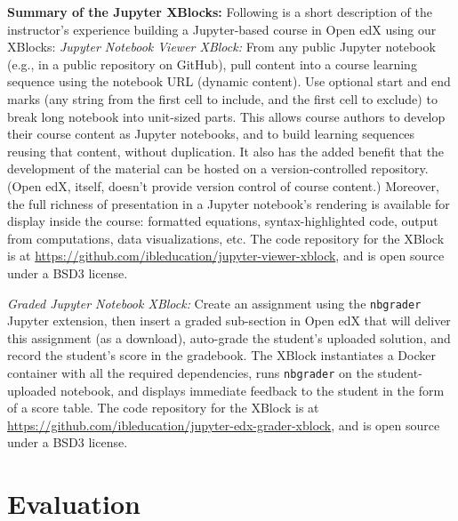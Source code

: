 \documentclass[10pt,journal,compsoc]{IEEEtran}
\begin{document}
\noindent \textbf{Summary of the Jupyter XBlocks:}
Following is a short description of the instructor's experience building a Jupyter-based course in Open edX using our XBlocks:
\emph{Jupyter Notebook Viewer XBlock:} From any public Jupyter notebook (e.g., in a public repository on GitHub), pull content into a course learning sequence using the notebook URL (dynamic content). 
Use optional start and end marks (any string from the first cell to include, and the first cell to exclude) to break long notebook into unit-sized parts. 
This allows course authors to develop their course content as Jupyter notebooks, and to build learning sequences reusing that content, without duplication. 
It also has the added benefit that the development of the material can be hosted on a version-controlled repository. (Open edX, itself, doesn't provide version control of course content.)
Moreover, the full richness of presentation in a Jupyter notebook's rendering is available for display inside the course: formatted equations, syntax-highlighted code, output from computations, data visualizations, etc.
The code repository for the XBlock is at \url{https://github.com/ibleducation/jupyter-viewer-xblock}, and is open source under a BSD3 license.

\emph{Graded Jupyter Notebook XBlock:} Create an assignment using the \texttt{nbgrader} Jupyter extension, then insert a graded sub-section in Open edX that will deliver this assignment (as a download), auto-grade the student's uploaded solution, and record the student's score in the gradebook. 
The XBlock instantiates a Docker container with all the required dependencies, runs \texttt{nbgrader} on the student-uploaded notebook, and displays immediate feedback to the student in the form of a score table. 
The code repository for the XBlock is at \url{https://github.com/ibleducation/jupyter-edx-grader-xblock}, and is open source under a BSD3 license.

\section{Evaluation}
\end{document}

